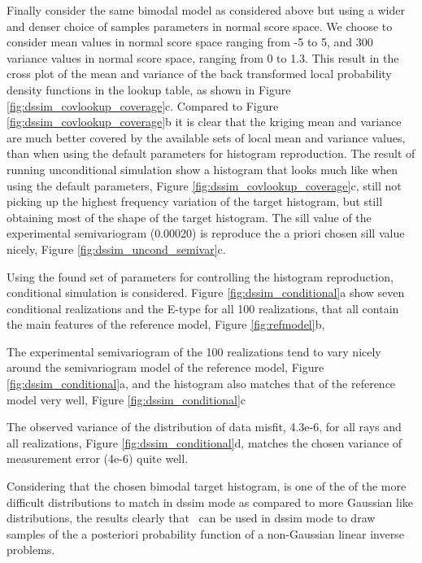 \documentclass[12t]{article}
\begin{document}
Finally consider the same bimodal model as considered above but using a wider and denser choice of samples parameters in normal score space.
We choose to consider mean values in normal score space ranging from -5 to 5, and 300
variance values in normal score space, ranging from 0 to 1.3. This
result in the cross plot of the mean and variance of the back transformed
local probability density functions in the lookup table, as shown in
Figure \ref{fig:dssim_covlookup_coverage}c. 
Compared to Figure \ref{fig:dssim_covlookup_coverage}b it is clear that the kriging mean and variance are much better covered by the available sets of local mean and variance values, than when using the default parameters for histogram reproduction.
The result of running unconditional simulation show a histogram that
looks much like when using the default parameters, Figure
\ref{fig:dssim_covlookup_coverage}c, still not picking up the highest
frequency variation of the target histogram, but still obtaining most
of the shape of the target histogram.
The sill value of the experimental semivariogram (0.00020) is
reproduce the a priori chosen sill value nicely, Figure \ref{fig:dssim_uncond_semivar}c.

Using the found set of parameters for controlling the histogram reproduction, conditional simulation is considered. 
Figure \ref{fig:dssim_conditional}a show seven conditional
realizations and the E-type for all 100 realizations, that all contain the main features of the reference model, Figure \ref{fig:refmodel}b, 

The experimental 
semivariogram of the 100 realizations tend to vary nicely around the
semivariogram model of the reference model,  Figure \ref{fig:dssim_conditional}a, and the histogram also
matches that of the reference model very well,  Figure \ref{fig:dssim_conditional}c 

The observed variance of the distribution of data misfit, 4.3e-6, for
all rays and all realizations, Figure \ref{fig:dssim_conditional}d, matches the chosen
variance of measurement error (4e-6) quite well.

Considering that the chosen bimodal target histogram, is one of the of the more difficult distributions to match in dssim mode as compared to more Gaussian like distributions, the results
clearly that \visimprog~can be used in dssim mode to draw samples of
the a posteriori probability function of a non-Gaussian linear inverse
problems. 
\end{document}
